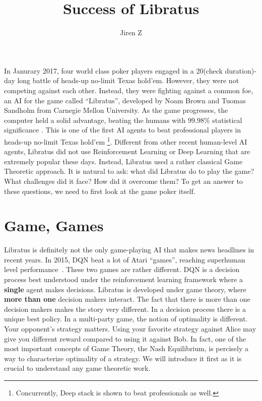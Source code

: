 \documentclass[10pt,a4paper]{article}
\author{Jiren Z}
\title{Success of Libratus}
\begin{document}
\maketitle

In Janurary 2017, four world class poker players engaged in a 20(check duration)-day long battle of heads-up no-limit Texas hold'em. However, they were not competing against each other. Instead, they were fighting against a common foe, an AI for the game called ``Libratus'', developed by Noam Brown and Tuomas Sandholm from Carnegie Mellon University. As the game progresses, the computer held a solid advantage, beating the humans with $99.98\%$ statistical significance \cite{brown2017superhuman}. This is one of the first AI agents to beat professional players in heads-up no-limit Texas hold'em \footnote{Concurrently, Deep stack \cite{moravvcik2017deepstack} is shown to beat professionals as well.}. Different from other recent human-level AI agents, Libratus did not use Reinforcement Learning or Deep Learning that are extremely popular these days. Instead, Libratus used a rather classical Game Theoretic approach. It is natural to ask: what did Libratus do to play the game? What challenges did it face? How did it overcome them? To get an answer to these questions, we need to first look at the game poker itself.

\section{Game, Games}
Libratus is definitely not the only game-playing AI that makes news headlines in recent years. In 2015, DQN beat a lot of Atari ``games'', reaching superhuman level performance~\cite{mnih2015human}. These two games are rather different. DQN is a decision process best understood under the reinforcement learning framework where a \textbf{single} agent makes decisions. Libratus is developed under game theory, where \textbf{more than one} decision makers interact. The fact that there is more than one decision makers makes the story very different. In a decision process there is a unique best policy. In a multi-party game, the notion of optimality is different. Your opponent's strategy matters. Using your favorite strategy against Alice may give you different reward compared to using it against Bob. In fact, one of the most important concepts of Game Theory, the Nash Equilibrium, is percisely a way to characterize optimality of a strategy. We will introduce it first as it is crucial to understand any game theoretic work.
\end{document}
